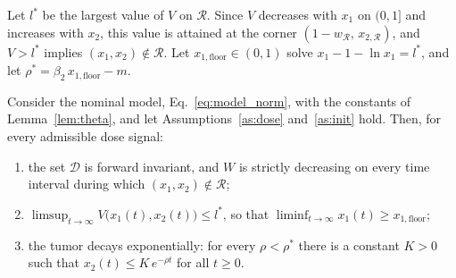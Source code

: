 Let $l^\ast$ be the largest value of $V$ on $\mathcal R$. Since $V$ decreases with $x_1$ on $(0,1]$ and increases with $x_2$, this value is attained at the corner $(1-w_{\mathcal R},\,x_{2,\mathcal R})$, and $V>l^\ast$ implies $(x_1,x_2)\notin\mathcal R$. Let $x_{1,\mathrm{floor}}\in(0,1)$ solve $x_1-1-\ln x_1=l^\ast$, and let $\rho^\ast=\beta_2\,x_{1,\mathrm{floor}}-m$.

\begin{theorem}
\label{thm:lyap}
Consider the nominal model, Eq.~\eqref{eq:model_norm}, with the constants of Lemma~\ref{lem:theta}, and let Assumptions~\ref{as:dose} and~\ref{as:init} hold. Then, for every admissible dose signal:
\begin{enumerate}
\item[(i)] the set $\mathcal D$ is forward invariant, and $W$ is strictly decreasing on every time interval during which $(x_1,x_2)\notin\mathcal R$;
\item[(ii)] $\limsup_{t\to\infty}V\bigl(x_1(t),x_2(t)\bigr)\le l^\ast$, so that $\liminf_{t\to\infty}x_1(t)\ge x_{1,\mathrm{floor}}$;
\item[(iii)] the tumor decays exponentially: for every $\rho<\rho^\ast$ there is a constant $K>0$ such that $x_2(t)\le K\,e^{-\rho t}$ for all $t\ge0$.
\end{enumerate}
\end{theorem}

